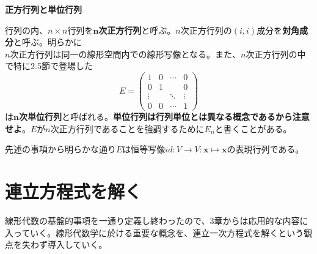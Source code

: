 \documentclass[dvipdfmx]{jsarticle}
\begin{document}
\textbf{正方行列と単位行列}\par
行列の内、$n \times n$行列を$\bm{n}$\textbf{次正方行列}と呼ぶ。$n$次正方行列の$(i,i)$成分を\textbf{対角成分}と呼ぶ。明らかに\\$n$次正方行列は同一の線形空間内での線形写像となる。また、$n$次正方行列の中で特に2.5節で登場した
\[E=\begin{pmatrix}1&0&\cdots&0\\0&1&{}&0\\\vdots&{}&\ddots&\vdots\\0&0&\cdots&1\end{pmatrix}\]
は$\bm{n}$\textbf{次単位行列}と呼ばれる。\textbf{単位行列は行列単位とは異なる概念であるから注意せよ}。$E$が$n$次正方行列であることを強調するために$E_n$と書くことがある。\par
先述の事項から明らかな通り$E$は恒等写像$id:V \to V:\bm{x}\mapsto\bm{x}$の表現行列である。

\section{連立方程式を解く}
線形代数の基盤的事項を一通り定義し終わったので、3章からは応用的な内容に入っていく。線形代数学に於ける重要な概念を、連立一次方程式を解くという観点を失わず導入していく。
\end{document}
